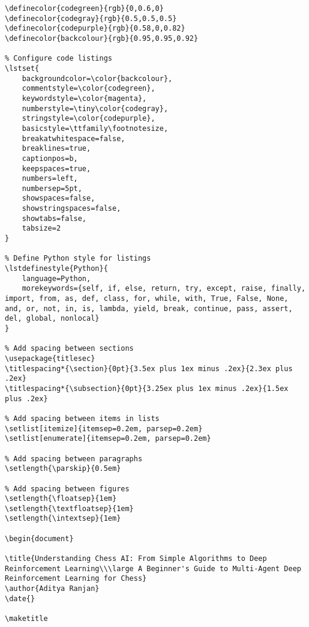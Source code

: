 \documentclass[11pt]{article}
\begin{document}
\begin{lstlisting}[style=Python]
% Define colors for code listings
\definecolor{codegreen}{rgb}{0,0.6,0}
\definecolor{codegray}{rgb}{0.5,0.5,0.5}
\definecolor{codepurple}{rgb}{0.58,0,0.82}
\definecolor{backcolour}{rgb}{0.95,0.95,0.92}

% Configure code listings
\lstset{
    backgroundcolor=\color{backcolour},
    commentstyle=\color{codegreen},
    keywordstyle=\color{magenta},
    numberstyle=\tiny\color{codegray},
    stringstyle=\color{codepurple},
    basicstyle=\ttfamily\footnotesize,
    breakatwhitespace=false,
    breaklines=true,
    captionpos=b,
    keepspaces=true,
    numbers=left,
    numbersep=5pt,
    showspaces=false,
    showstringspaces=false,
    showtabs=false,
    tabsize=2
}

% Define Python style for listings
\lstdefinestyle{Python}{
    language=Python,
    morekeywords={self, if, else, return, try, except, raise, finally, import, from, as, def, class, for, while, with, True, False, None, and, or, not, in, is, lambda, yield, break, continue, pass, assert, del, global, nonlocal}
}

% Add spacing between sections
\usepackage{titlesec}
\titlespacing*{\section}{0pt}{3.5ex plus 1ex minus .2ex}{2.3ex plus .2ex}
\titlespacing*{\subsection}{0pt}{3.25ex plus 1ex minus .2ex}{1.5ex plus .2ex}

% Add spacing between items in lists
\setlist[itemize]{itemsep=0.2em, parsep=0.2em}
\setlist[enumerate]{itemsep=0.2em, parsep=0.2em}

% Add spacing between paragraphs
\setlength{\parskip}{0.5em}

% Add spacing between figures
\setlength{\floatsep}{1em}
\setlength{\textfloatsep}{1em}
\setlength{\intextsep}{1em}

\begin{document}

\title{Understanding Chess AI: From Simple Algorithms to Deep Reinforcement Learning\\\large A Beginner's Guide to Multi-Agent Deep Reinforcement Learning for Chess}
\author{Aditya Ranjan}
\date{}

\maketitle


\end{lstlisting}
\end{document}
